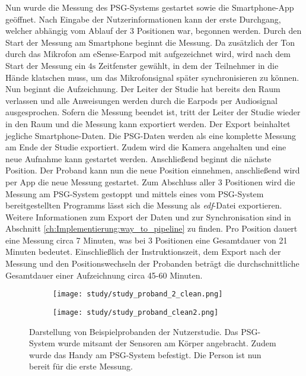 Nun wurde die Messung des PSG-Systems gestartet sowie die Smartphone-App geöffnet. 
Nach Eingabe der Nutzerinformationen kann der erste Durchgang, welcher abhängig vom Ablauf der 3 Positionen war, begonnen werden.
Durch den Start der Messung am Smartphone beginnt die Messung. 
Da zusätzlich der Ton durch das Mikrofon am eSense-Earpod mit aufgezeichnet wird, wird nach dem Start der Messung ein $4\si{\s}$ Zeitfenster gewählt, in dem der Teilnehmer in die Hände klatschen muss, um das Mikrofonsignal später synchronisieren zu können.
Nun beginnt die Aufzeichnung. Der Leiter der Studie hat bereits den Raum verlassen und alle Anweisungen werden durch die Earpods per Audiosignal ausgesprochen. 
Sofern die Messung beendet ist, tritt der Leiter der Studie wieder in den Raum und die Messung kann exportiert werden. 
Der Export beinhaltet jegliche Smartphone-Daten. Die PSG-Daten werden als eine komplette Messung am Ende der Studie exportiert.
Zudem wird die Kamera angehalten und eine neue Aufnahme kann gestartet werden.
Anschließend beginnt die nächste Position. Der Proband kann nun die neue Position einnehmen, anschließend wird per App die neue Messung gestartet.
Zum Abschluss aller 3 Positionen wird die Messung am PSG-System gestoppt und mittels eines vom PSG-System bereitgestellten Programms lässt sich die Messung als {\glqq \textit{edf}-Datei\grqq} exportieren.
Weitere Informationen zum Export der Daten und zur Synchronisation sind in Abschnitt \ref{ch:Implementierung:way_to_pipeline} zu finden.
Pro Position dauert eine Messung circa 7 Minuten, was bei 3 Positionen eine Gesamtdauer von 21 Minuten bedeutet.
Einschließlich der Instruktionszeit, dem Export nach der Messung und den Positionswechseln der Probanden beträgt die durchschnittliche Gesamtdauer einer Aufzeichnung circa 45-60 Minuten. 

\begin{figure}[ht]
    \centering
    \begin{subfigure}{0.53\textwidth}
        \texttt{[image: study/study\_proband\_2\_clean.png]}
    \end{subfigure}
    \begin{subfigure}{0.3\textwidth}
        \texttt{[image: study/study\_proband\_clean2.png]}
    \end{subfigure}
    \caption{Darstellung von Beispielprobanden der Nutzerstudie. Das PSG-System wurde mitsamt der Sensoren am Körper angebracht. Zudem wurde das Handy am PSG-System befestigt. Die Person ist nun bereit für die erste Messung.}
    \label{implementation:study:measurement_example}
\end{figure}

